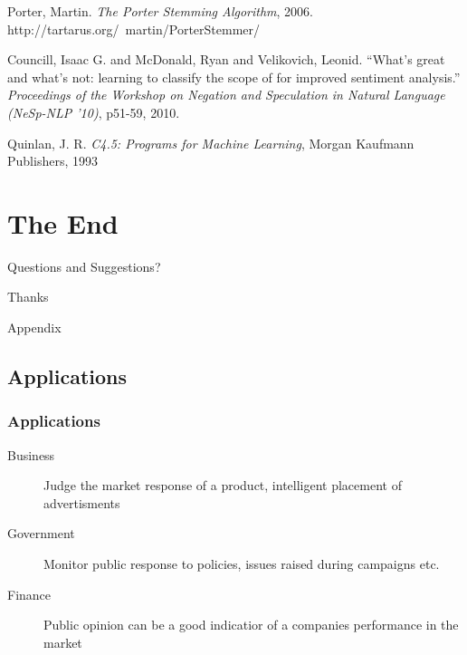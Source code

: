 \documentclass{beamer}
\begin{document}
\begin{frame}[allowframebreaks]
{\begin{thebibliography}{99}
	Porter, Martin.
	\textit{The Porter Stemming Algorithm}, 2006.
	http://tartarus.org/~martin/PorterStemmer/

	Councill, Isaac G. and McDonald, Ryan and Velikovich, Leonid.
	``What's great and what's not: learning to classify the scope of for improved sentiment analysis.''
	\textit{Proceedings of the Workshop on Negation and Speculation in Natural Language (NeSp-NLP '10)}, p51-59, 2010.

	Quinlan, J. R.
	\textit{C4.5: Programs for Machine Learning}, Morgan Kaufmann Publishers, 1993

\end{thebibliography}
}
\end{frame}

\section*{The End}

\begin{frame}
\Huge{\centerline{Questions and Suggestions?}}
\end{frame}

\begin{frame}
\Huge{\centerline{Thanks}}
\end{frame}


\appendix

\begin{frame}
\Huge{\centerline{Appendix}}
\end{frame}

\subsection{Applications}

\begin{frame}
\frametitle{Applications}
\begin{description}
\item [Business] {Judge the market response of a product, intelligent placement of advertisments}
\item [Government] {Monitor public response to policies, issues raised during campaigns etc.}
\item [Finance] {Public opinion can be a good indicatior of a companies performance in the market}
\end{description}
\end{frame}
\end{document}
